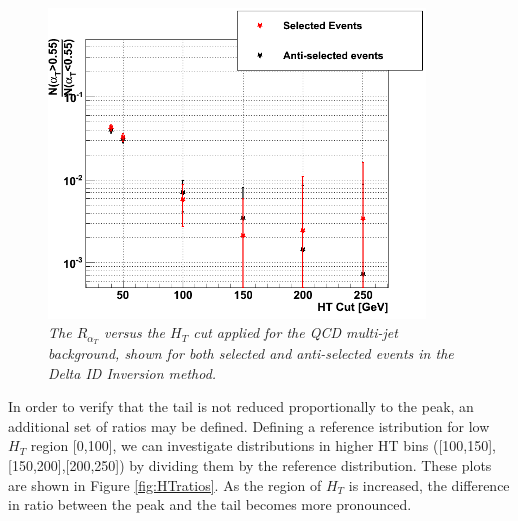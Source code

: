 \documentclass{article}
\begin{document}
\begin{figure}[h!]
\begin{center}
\includegraphics[width=100mm]{AlphaTRatio.png}
\end{center}
\caption{\textit{The $R_{\alpha_T}$ versus the $H_{T}$ cut applied for the QCD multi-jet background, shown for both selected and anti-selected events in the Delta ID Inversion method.}}
\label{fig:AlphaT_Ratio}
\end{figure}

In order to verify that the tail is not reduced proportionally to the peak, an additional set of ratios may be defined. Defining a reference istribution for low $H_{T}$ region [0,100], we can investigate distributions in higher HT bins ([100,150],[150,200],[200,250]) by dividing them by the reference distribution. These plots are shown in Figure \ref{fig:HTratios}. As the region of $H_{T}$ is increased, the difference in ratio between the peak and the tail becomes more pronounced. 
\end{document}
